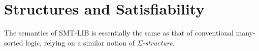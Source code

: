 \section{Structures and Satisfiability} \label{sec:models}

The semantics of SMT-LIB is essentially the same as that 
of conventional many-sorted logic,
relying on a similar notion of \emph{$\Sigma$-structure}.



